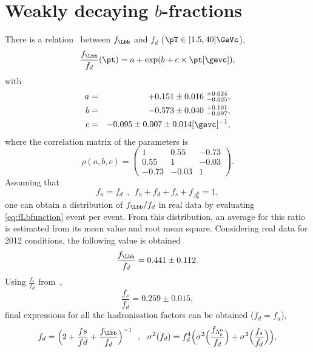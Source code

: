 \cleardoublepage
\chapter{Weakly decaying $b$-fractions}\label{app:BsJpsiKst_peaking}
There is a relation~\cite{LHCb-PAPER-2014-004} between $f_{\Lbb}$ and $f_d$ ($\pT\in[1.5,40]\GeVc$),
\begin{equation}\label{eq:fLbfunction}
\frac{f_{\Lbb}}{f_d}(\pt) = a + {\rm exp}(b + c\times\pt[\gevc]),
\end{equation}
with
\begin{eqnarray}
a &=& +0.151 \pm 0.016^{~+0.024}_{~-0.025}, \nonumber\\
b &=& -0.573 \pm 0.040^{~+0.101}_{~-0.097}, \nonumber\\
c &=& -0.095 \pm 0.007 \pm 0.014 [\gevc]^{-1}, \nonumber
\end{eqnarray}
where the correlation matrix of the parameters is
\[ \rho(a,b,c) = \left(\begin{array}{ccc}
1     & 0.55  & -0.73 \\
0.55  & 1     & -0.03 \\
-0.73 & -0.03 & 1 \end{array}\right).\]
Assuming that
\begin{equation}
f_u = f_d~~,~~f_u + f_d + f_s + f_{\Lambda_b^0} = 1,
\end{equation}
one can obtain a distribution of  ${f_{\Lbb}}/{f_d}$ in real data by evaluating \eqref{eq:fLbfunction} event per event. From this distribution, an average for this ratio is estimated from its mean value and root mean square. Considering real data for 2012 conditions, the following value is obtained
\begin{equation}\label{eq:meanLbVal}
\frac{f_{{\Lbb}}}{f_d} = 0.441 \pm 0.112.
\end{equation}
Using $\frac{f_s}{f_d}$ from~\cite{fdfs},
\begin{equation}
\frac{f_s}{f_d} = 0.259 \pm 0.015,
\end{equation}
final expressions for all the hadronisation factors can be obtained ($f_d = f_u$),
\begin{equation}
f_d = \Big(2+\frac{fs}{fd}+\frac{f_{{\Lbb}}}{f_d}\Big)^{-1}~~,~~\sigma^2(f_d) = {f_d^4}\Big(\sigma^2\Big(\frac{f_{\Lambda_b^0}}{f_d}\Big) + \sigma^2\Big(\frac{f_s}{f_d}\Big)\Big),
\end{equation}
